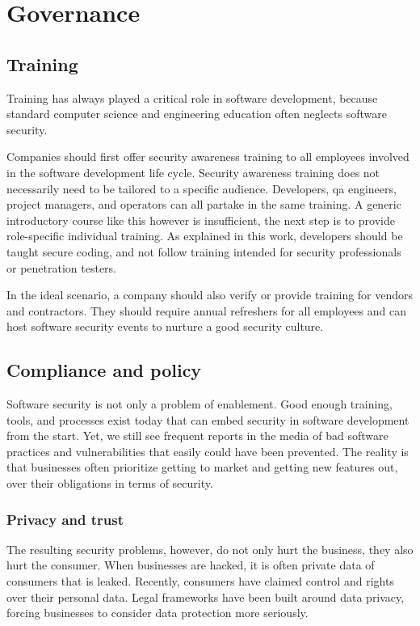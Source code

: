\section{Governance}
\label{sec:related-plan}

\subsection{Training}
Training has always played a critical role in software development, because standard computer science and engineering education often neglects software security.

Companies should first offer security awareness training to all employees involved in the software development life cycle.
Security awareness training does not necessarily need to be tailored to a specific audience.
Developers, \gls{qa} engineers, project managers, and operators can all partake in the same training.
A generic introductory course like this however is insufficient, the next step is to provide role-specific individual training.
As explained in this work, developers should be taught secure coding, and not follow training intended for security professionals or penetration testers.

In the ideal scenario, a company should also verify or provide training for vendors and contractors.
They should require annual refreshers for all employees and can host software security events to nurture a good security culture.

\subsection{Compliance and policy}
Software security is not only a problem of enablement.
Good enough training, tools, and processes exist today that can embed security in software development from the start.
Yet, we still see frequent reports in the media of bad software practices and vulnerabilities that easily could have been prevented.
The reality is that businesses often prioritize getting to market and getting new features out, over their obligations in terms of security.

\subsubsection{Privacy and trust}
The resulting security problems, however, do not only hurt the business, they also hurt the consumer.
When businesses are hacked, it is often private data of consumers that is leaked.
Recently, consumers have claimed control and rights over their personal data.
Legal frameworks have been built around data privacy, forcing businesses to consider data protection more seriously.

